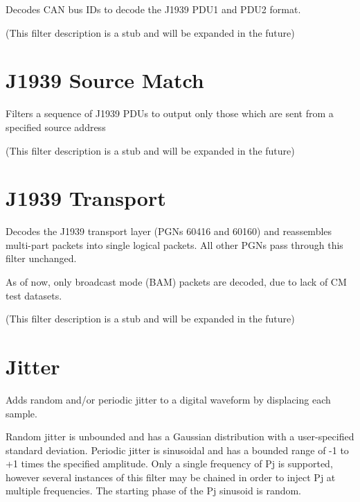 Decodes CAN bus IDs to decode the J1939 PDU1 and PDU2 format.

(This filter description is a stub and will be expanded in the future)

\pagebreak
\section{J1939 Source Match}
\label{filter:j1939srcmatch}

Filters a sequence of J1939 PDUs to output only those which are sent from a specified source address

(This filter description is a stub and will be expanded in the future)

\pagebreak
\section{J1939 Transport}
\label{filter:j1939transport}

Decodes the J1939 transport layer (PGNs 60416 and 60160) and reassembles multi-part packets into single logical packets.
All other PGNs pass through this filter unchanged.

As of now, only broadcast mode (BAM) packets are decoded, due to lack of CM test datasets.

(This filter description is a stub and will be expanded in the future)

\pagebreak
\section{Jitter}
\label{filter:jitter}

Adds random and/or periodic jitter to a digital waveform by displacing each sample.

Random jitter is unbounded and has a Gaussian distribution with a user-specified standard deviation. Periodic jitter is
sinusoidal and has a bounded range of -1 to +1 times the specified amplitude. Only a single frequency of Pj is
supported, however several instances of this filter may be chained in order to inject Pj at multiple frequencies. The
starting phase of the Pj sinusoid is random.

